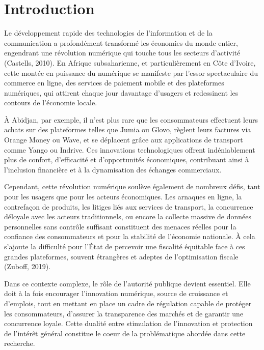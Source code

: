 
\section*{Introduction}

Le développement rapide des technologies de l'information et de la communication a profondément transformé les économies du monde entier, engendrant une révolution numérique qui touche tous les secteurs d'activité (Castells, 2010). En Afrique subsaharienne, et particulièrement en Côte d'Ivoire, cette montée en puissance du numérique se manifeste par l'essor spectaculaire du commerce en ligne, des services de paiement mobile et des plateformes numériques, qui attirent chaque jour davantage d'usagers et redessinent les contours de l'économie locale.

À Abidjan, par exemple, il n'est plus rare que les consommateurs effectuent leurs achats sur des plateformes telles que Jumia ou Glovo, règlent leurs factures via Orange Money ou Wave, et se déplacent grâce aux applications de transport comme Yango ou Indrive. Ces innovations technologiques offrent indéniablement plus de confort, d'efficacité et d'opportunités économiques, contribuant ainsi à l'inclusion financière et à la dynamisation des échanges commerciaux.

Cependant, cette révolution numérique soulève également de nombreux défis, tant pour les usagers que pour les acteurs économiques. Les arnaques en ligne, la contrefaçon de produits, les litiges liés aux services de transport, la concurrence déloyale avec les acteurs traditionnels, ou encore la collecte massive de données personnelles sans contrôle suffisant constituent des menaces réelles pour la confiance des consommateurs et pour la stabilité de l'économie nationale. À cela s'ajoute la difficulté pour l'État de percevoir une fiscalité équitable face à ces grandes plateformes, souvent étrangères et adeptes de l'optimisation fiscale (Zuboff, 2019).

Dans ce contexte complexe, le rôle de l'autorité publique devient essentiel. Elle doit à la fois encourager l'innovation numérique, source de croissance et d'emplois, tout en mettant en place un cadre de régulation capable de protéger les consommateurs, d'assurer la transparence des marchés et de garantir une concurrence loyale. Cette dualité entre stimulation de l'innovation et protection de l'intérêt général constitue le coeur de la problématique abordée dans cette recherche.

